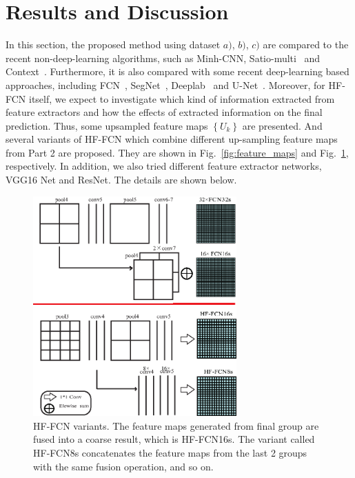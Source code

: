 \section{Results and Discussion}
\label{Sec:Res}

In this section, the proposed method using dataset ${a)}$, ${b)}$, ${c)}$ are compared to the recent non-deep-learning algorithms, such as Minh-CNN\cite{IEEEexample:mnih2013machine}, Satio-multi~\cite{IEEEexample:saito2016multiple} and Context~\cite{IEEEexample:audebert2017deep}.
%
Furthermore, it is also compared with some recent deep-learning based approaches, including FCN~\cite{IEEEexample:Long_2015_CVPR}, SegNet~\cite{IEEEexample:badrinarayanan2017segnet}, Deeplab~\cite{IEEEexample:chen2016deeplab} and U-Net~\cite{IEEEexample:ronneberger2015u}.
Moreover, for HF-FCN itself, we expect to investigate which kind of information extracted from feature extractors and how the effects of extracted information on the final prediction.
Thus, some upsampled feature maps ${\left\{U_k\right\}}$ are presented. 
And several variants of HF-FCN which combine different up-sampling feature maps from Part 2 are proposed.
They are shown in Fig.~\ref{fig:feature_maps} and Fig.~\ref{fig:Variants}, respectively.
In addition, we also tried different feature extractor networks, VGG16 Net and ResNet. The details are shown below.

\begin{figure}[t]
\begin{center}
\includegraphics[width=7.8cm]{Figures/vairants.eps}
\caption{HF-FCN variants. The feature maps generated from final group are fused into a coarse result, which is HF-FCN16s. The variant called HF-FCN8s concatenates the feature maps from the last 2 groups with the same fusion operation, and so on.}
\label{fig:Variants}
\end{center}
\end{figure}

